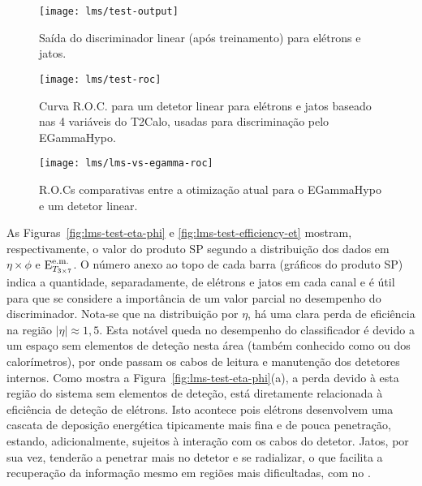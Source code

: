 \begin{figure}
\begin{center}
\texttt{[image: lms/test-output]}
\end{center}
\caption{Saída do discriminador linear (após treinamento) para elétrons e
jatos.}
\label{fig:lms-test-output}
\end{figure}

\begin{figure}
\begin{center}
\texttt{[image: lms/test-roc]}
\end{center}
\caption{Curva R.O.C. para um detetor linear para elétrons e jatos baseado nas
4 variáveis do T2Calo, usadas para discriminação pelo EGammaHypo.}
\label{fig:lms-test-roc}
\end{figure}

\begin{figure}
\begin{center}
\texttt{[image: lms/lms-vs-egamma-roc]}
\end{center}
\caption{R.O.Cs comparativas entre a otimização atual para o EGammaHypo e um
detetor linear.}
\label{fig:lms-vs-egamma-roc}
\end{figure}

As Figuras~\ref{fig:lms-test-eta-phi} e \ref{fig:lms-test-efficiency-et}
mostram, respectivamente, o valor do produto SP segundo a distribuição dos
dados em $\eta\times\phi$ e $\text{E}^{\text{e.m.}}_{T_{3\times7}}$. O número anexo ao topo de cada barra
(gráficos do produto SP) indica a quantidade, separadamente, de elétrons e
jatos em cada canal e é útil para que se considere a importância de um valor
parcial no desempenho do discriminador. Nota-se que na distribuição por
$\eta$, há uma clara perda de eficiência na região $|\eta| \approx 1,5$. Esta
notável queda no desempenho do classificador é devido a um espaço sem
elementos de deteção nesta área (também conhecido como  ou
 dos calorímetros), por onde passam os cabos de leitura e
manutenção dos detetores internos. Como mostra a
Figura~\ref{fig:lms-test-eta-phi}(a), a perda devido à esta região do sistema
sem elementos de deteção, está diretamente relacionada à eficiência de deteção
de elétrons. Isto acontece pois elétrons desenvolvem uma cascata de deposição
energética tipicamente mais fina e de pouca penetração, estando,
adicionalmente, sujeitos à interação com os cabos do detetor. Jatos, por sua
vez, tenderão a penetrar mais no detetor e se radializar, o que facilita a
recuperação da informação mesmo em regiões mais dificultadas, com no
.

